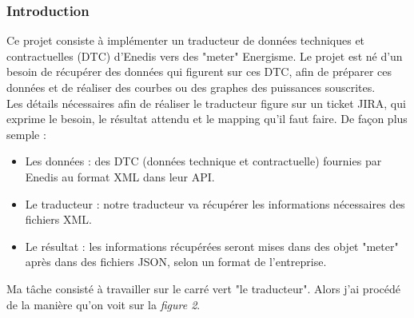 \subsubsection{Introduction}
Ce projet consiste à implémenter un traducteur de données techniques et contractuelles (DTC) d'Enedis vers des "meter" Energisme. Le projet est né d'un besoin de récupérer des données qui figurent sur ces DTC, afin de préparer ces données et de réaliser des courbes ou des graphes des puissances souscrites.\\
Les détails nécessaires afin de réaliser le traducteur figure sur un ticket JIRA, qui exprime le besoin, le résultat attendu et le mapping qu'il faut faire. De façon plus semple :
\begin{itemize}
	\item Les données : des DTC (données technique et contractuelle) fournies par Enedis au format XML dans leur API.
	\item Le traducteur : notre traducteur va récupérer les informations  nécessaires des fichiers XML.
	\item Le résultat : les informations récupérées seront mises dans des objet "meter" après dans des fichiers JSON, selon un format de l'entreprise.
\end{itemize}


Ma tâche consisté à travailler sur le carré vert "le traducteur". Alors j'ai procédé de la manière qu'on voit sur la \emph{figure 2}.
